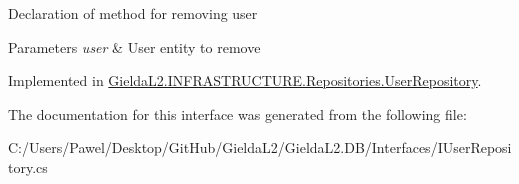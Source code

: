 Declaration of method for removing user 


\begin{DoxyParams}{Parameters}
{\em user} & User entity to remove\\
\hline
\end{DoxyParams}


Implemented in \mbox{\hyperlink{class_gielda_l2_1_1_i_n_f_r_a_s_t_r_u_c_t_u_r_e_1_1_repositories_1_1_user_repository_a8715ce2a146a846905609162c41a6483}{Gielda\+L2.\+I\+N\+F\+R\+A\+S\+T\+R\+U\+C\+T\+U\+R\+E.\+Repositories.\+User\+Repository}}.



The documentation for this interface was generated from the following file\+:\begin{DoxyCompactItemize}
\item 
C\+:/\+Users/\+Pawel/\+Desktop/\+Git\+Hub/\+Gielda\+L2/\+Gielda\+L2.\+D\+B/\+Interfaces/I\+User\+Repository.\+cs\end{DoxyCompactItemize}
